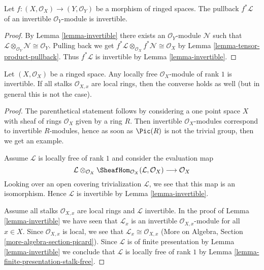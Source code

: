 \begin{lemma}
\label{lemma-pullback-invertible}
Let $f : (X, \mathcal{O}_X) \to (Y, \mathcal{O}_Y)$ be a
morphism of ringed spaces. The pullback $f^*\mathcal{L}$ of an
invertible $\mathcal{O}_Y$-module is invertible.
\end{lemma}

\begin{proof}
By Lemma \ref{lemma-invertible}
there exists an $\mathcal{O}_Y$-module $\mathcal{N}$ such that
$\mathcal{L} \otimes_{\mathcal{O}_Y} \mathcal{N} \cong \mathcal{O}_Y$.
Pulling back we get
$f^*\mathcal{L} \otimes_{\mathcal{O}_X} f^*\mathcal{N} \cong \mathcal{O}_X$
by Lemma \ref{lemma-tensor-product-pullback}.
Thus $f^*\mathcal{L}$ is invertible by Lemma \ref{lemma-invertible}.
\end{proof}

\begin{lemma}
\label{lemma-invertible-is-locally-free-rank-1}
Let $(X, \mathcal{O}_X)$ be a ringed space. Any locally free
$\mathcal{O}_X$-module of rank $1$ is invertible.
If all stalks $\mathcal{O}_{X, x}$ are local rings, then
the converse holds as well (but in general this is not the case).
\end{lemma}

\begin{proof}
The parenthetical statement follows by considering a one point
space $X$ with sheaf of rings $\mathcal{O}_X$ given by a ring $R$.
Then invertible $\mathcal{O}_X$-modules correspond to invertible
$R$-modules, hence as soon as $\Pic(R)$ is not the trivial group,
then we get an example.

\medskip\noindent
Assume $\mathcal{L}$ is locally free of rank $1$ and consider the
evaluation map
$$
\mathcal{L} \otimes_{\mathcal{O}_X}
\SheafHom_{\mathcal{O}_X}(\mathcal{L}, \mathcal{O}_X)
\longrightarrow \mathcal{O}_X
$$
Looking over an open covering trivialization $\mathcal{L}$, we see
that this map is an isomorphism. Hence $\mathcal{L}$ is invertible
by Lemma \ref{lemma-invertible}.

\medskip\noindent
Assume all stalks $\mathcal{O}_{X, x}$ are local rings and $\mathcal{L}$
invertible. In the proof of Lemma \ref{lemma-invertible}
we have seen that $\mathcal{L}_x$ is an invertible
$\mathcal{O}_{X, x}$-module for all $x \in X$. Since
$\mathcal{O}_{X, x}$ is local, we see that
$\mathcal{L}_x \cong \mathcal{O}_{X, x}$
(More on Algebra, Section \ref{more-algebra-section-picard}).
Since $\mathcal{L}$ is of finite presentation by
Lemma \ref{lemma-invertible} we conclude that $\mathcal{L}$
is locally free of rank $1$ by
Lemma \ref{lemma-finite-presentation-stalk-free}.
\end{proof}

